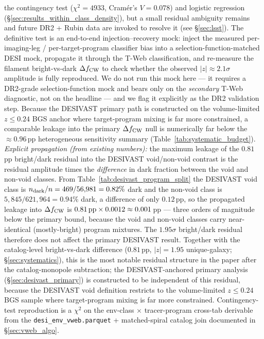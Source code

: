 \documentclass[aps,prd,twocolumn,superscriptaddress,showpacs,preprintnumbers,nofootinbib,longbibliography,floatfix]{revtex4-2}
\begin{document}
the contingency test ($\chi^2\!=\!4933$, Cram\'{e}r's $V\!=\!0.078$)
and logistic regression (\S\ref{sec:results_within_class_density}),
but a small residual ambiguity remains and future DR2 + Rubin data
are invoked to resolve it (see \S\ref{sec:lsst}). The definitive test
is an end-to-end injection--recovery mock: inject the measured
per-imaging-leg / per-target-program classifier bias into a
selection-function-matched DESI mock, propagate it through the
T-Web classification, and re-measure the filament bright-vs-dark
$\Delta f_{\rm CW}$ to check whether the observed
$|z|\!\approx\!2.1\sigma$ amplitude is fully reproduced. We do not run
this mock here --- it requires a DR2-grade selection-function mock and
bears only on the \emph{secondary} T-Web diagnostic, not on the headline
--- and we flag it explicitly as the DR2 validation step. Because the
DESIVAST primary path is constructed on the volume-limited $z\!\le\!0.24$
BGS anchor where target-program mixing is far more constrained, a
comparable leakage into the primary $\Delta f_{\rm CW}$ null
is numerically far below the ${\approx}0.96$\,pp heterogeneous sensitivity summary
(Table~\ref{tab:systematic_budget}).
\emph{Explicit propagation (from existing numbers):} the maximum leakage
of the $0.81$\,pp bright/dark residual into the DESIVAST void/non-void
contrast is the residual amplitude times the \emph{difference} in dark
fraction between the void and non-void classes. From
Table~\ref{tab:desivast_program_split} the DESIVAST void class is
$n_{\rm dark}/n = 469/56{,}981 = 0.82\%$ dark and the non-void class is
$5{,}845/621{,}964 = 0.94\%$ dark, a difference of only $0.12$\,pp, so the
propagated leakage into $\Delta f_{\rm CW}$ is
$0.81\,{\rm pp}\times 0.0012 \approx 0.001$\,pp --- three orders of
magnitude below the primary bound, because the void and non-void classes
carry near-identical (mostly-bright) program mixtures. The $1.95\sigma$
bright/dark residual therefore does not affect the primary DESIVAST
result.
Together with the catalog-level bright-vs-dark difference
($0.81$\,pp, $|z| = 1.95$ unique-galaxy; \S\ref{sec:systematics}), this is the
most notable residual structure in the paper after
the catalog-monopole subtraction; the DESIVAST-anchored primary
analysis (\S\ref{sec:desivast_primary}) is constructed to be
independent of this residual, because the DESIVAST void definition
restricts to the volume-limited $z \leq 0.24$ BGS sample where
target-program mixing is far more constrained. Contingency-test reproduction is a $\chi^{2}$ on the env-class
$\times$ tracer-program cross-tab derivable from the
\texttt{desi\_env\_vweb.parquet} + matched-spiral catalog join
documented in \S\ref{sec:vweb_algo}.
\end{document}

